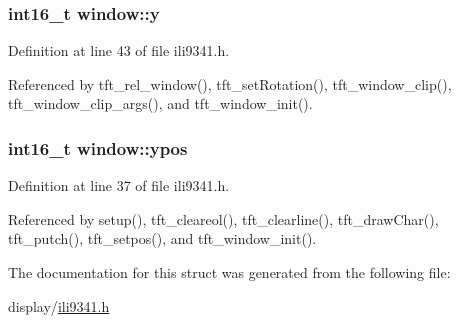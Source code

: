 \hypertarget{structwindow_a95c7023fc42e79ab42c291b90a490776}{
\subsubsection[{y}]{\setlength{\rightskip}{0pt plus 5cm}int16\-\_\-t window\-::y}}\label{structwindow_a95c7023fc42e79ab42c291b90a490776}


Definition at line 43 of file ili9341.\-h.



Referenced by tft\-\_\-rel\-\_\-window(), tft\-\_\-set\-Rotation(), tft\-\_\-window\-\_\-clip(), tft\-\_\-window\-\_\-clip\-\_\-args(), and tft\-\_\-window\-\_\-init().

\hypertarget{structwindow_a64bdec4f0ee274a96d696b16de783746}{
\subsubsection[{ypos}]{\setlength{\rightskip}{0pt plus 5cm}int16\-\_\-t window\-::ypos}}\label{structwindow_a64bdec4f0ee274a96d696b16de783746}


Definition at line 37 of file ili9341.\-h.



Referenced by setup(), tft\-\_\-cleareol(), tft\-\_\-clearline(), tft\-\_\-draw\-Char(), tft\-\_\-putch(), tft\-\_\-setpos(), and tft\-\_\-window\-\_\-init().



The documentation for this struct was generated from the following file\-:\begin{DoxyCompactItemize}
\item 
display/\hyperlink{ili9341_8h}{ili9341.\-h}\end{DoxyCompactItemize}
